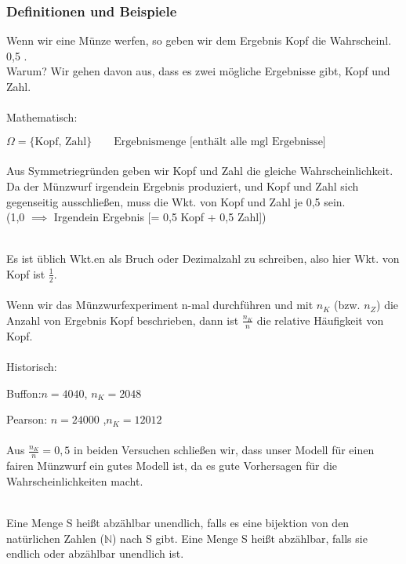 \documentclass[a4paper,12pt]{article}
\newcounter{Section} %
\newcounter{Definition}[Section]
\newcounter{Beispiel}[Definition]
\newcommand{\Bem}[2][]{ %
	
	\begin{tcolorbox}[breakable,colback=yellow!5,colframe=yellow!65!black,title=\textbf{Bemerkung: #1}]
		{#2}
	\end{tcolorbox}
	
}
\newcommand{\Def}[2][]{ %
	{
		\stepcounter{Definition}
		
		
		\begin{tcolorbox}[breakable,colback=red!0,colframe=red!85!black,title=\textbf{Def. 	\arabic{Definition} \quad #1:}]
			
			{#2}
		\end{tcolorbox}
		
		
	}

}
\begin{document}
		\subsubsection{Definitionen und Beispiele}
		Wenn wir eine Münze werfen, so geben wir dem Ergebnis Kopf die Wahrscheinl. 0,5 .\\
		Warum? \qquad Wir gehen davon aus, dass es zwei mögliche Ergebnisse gibt, Kopf und Zahl.\\
		\\Mathematisch:\\
		\par$\Omega = \{\text{Kopf, Zahl}\} \qquad  \text{Ergebnismenge [enthält alle mgl Ergebnisse]}$\\\\
		Aus Symmetriegründen geben wir Kopf und Zahl die gleiche Wahrscheinlichkeit. Da der Münzwurf irgendein Ergebnis produziert, und Kopf und Zahl sich gegenseitig ausschließen, muss die Wkt. von Kopf und Zahl je 0,5 sein.\\(1,0 $\implies$ Irgendein Ergebnis [= 0,5 Kopf + 0,5 Zahl])\\\\
		\Bem{ 
			\par Es ist üblich Wkt.en als Bruch oder Dezimalzahl zu schreiben, also hier Wkt. von Kopf ist $\frac{1}{2}$.\\\\
				Wenn wir das Münzwurfexperiment n-mal durchführen und mit $n_K$ (bzw. $n_Z$) die Anzahl von Ergebnis Kopf beschrieben, dann ist $\frac{n_K}{n}$ die relative Häufigkeit von Kopf.\\\\
			Historisch:\\
			\par  Buffon:\qquad $n=4040$, \qquad $n_K =2048$\\
			\par Pearson: \qquad $n=24000$ ,\qquad $n_K=12012$\\\\
			Aus $\frac{n_K}{n}=0,5$ in beiden Versuchen schließen wir, dass unser Modell für einen fairen Münzwurf ein gutes Modell ist, da es gute Vorhersagen für die Wahrscheinlichkeiten macht.\\\\
		}
		
		\Def{ 
			Eine Menge S heißt abzählbar unendlich, falls es eine bijektion von den natürlichen Zahlen ($\mathbb{N}$) nach S gibt. Eine Menge S heißt abzählbar, falls sie endlich oder abzählbar unendlich ist.
		}
		
\end{document}
